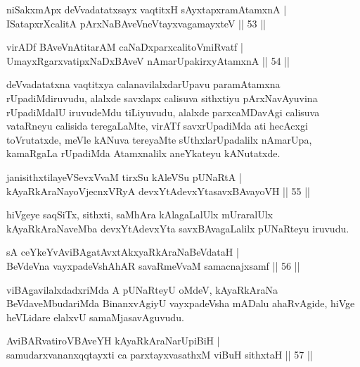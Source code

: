 \begin{shl}
niSakxmApx deVvadatatxsayx vaqtitxH sAyxtapxramAtamxnA  | \\
ISatapxrXcalitA pArxNaBAveVneVtayxvagamayxteV \hfill||  53 ||  
\end{shl}

\begin{shl}
virADf BAveVnAtitarAM caNaDxparxcalitoVmiRvatf  | \\
UmayxRgarxvatipxNaDxBAveV nAmarUpakirxyAtamxnA \hfill||  54 ||  
\end{shl}

\begin{artha}
deVvadatatxna vaqtitxya calanavilalxdarUpavu paramAtamxna rUpadiMdiruvudu, alalxde savxlapx calisuva sithxtiyu pArxNavAyuvina rUpadiMdalU iruvudeMdu tiLiyuvudu, alalxde parxcaMDavAgi calisuva vataRneyu calisida teregaLaMte, virATf savxrUpadiMda ati hecAcxgi toVrutatxde, meVle kANuva tereyaMte sUthxlarUpadalilx nAmarUpa, kamaRgaLa rUpadiMda Atamxnalilx aneYkateyu kANutatxde.
\end{artha}


\begin{shl}
janisithxtilayeVSevxVvaM tirxSu kAleVSu pUNaRtA  | \\
kAyaRkAraNayoVjecnxVRyA devxYtAdevxYtasavxBAvayoVH \hfill||  55 ||  
\end{shl}

\begin{artha}
hiVgeye saqSiTx, sithxti, saMhAra kAlagaLalUlx mUraralUlx kAyaRkAraNaveMba devxYtAdevxYta savxBAvagaLalilx pUNaRteyu iruvudu.
\end{artha}

\begin{shl}
sA ceYkeYvAviBAgatAvxtAkxyaRkAraNaBeVdataH  | \\
BeVdeVna vayxpadeVshAhAR savaRmeVvaM samacnajxsamf \hfill||  56 ||  
\end{shl}

\begin{artha}
viBAgavilalxdadxriMda A pUNaRteyU oMdeV, kAyaRkAraNa BeVdaveMbudariMda BinanxvAgiyU vayxpadeVsha mADalu ahaRvAgide, hiVge heVLidare elalxvU samaMjasavAguvudu.
\end{artha}

\begin{shl}
AviBARvatiroVBAveYH kAyaRkAraNarUpiBiH  | \\
samudarxvananxqqtayxti ca parxtayxvasathxM viBuH sithxtaH \hfill||  57 ||  
\end{shl}

